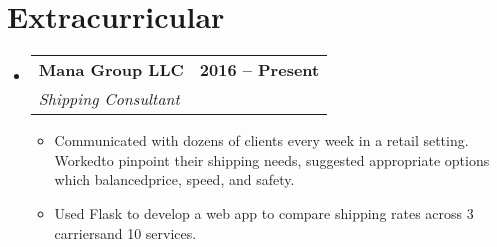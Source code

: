 \documentclass[letterpaper,11pt]{article}
\makeatletter
\newcommand{\resumeItem}[1]{
  \item\small{
    {#1 \vspace{-2pt}}
  }
}
\newcommand{\resumeSubheading}[4]{
  \vspace{-2pt}\item
    \begin{tabular*}{1.0\textwidth}[t]{l@{\extracolsep{\fill}}r}
      \textbf{#1} & \textbf{\small #2} \\
      \textit{\small#3} & \textit{\small #4} \\
    \end{tabular*}\vspace{-7pt}
}
\newcommand{\resumeSubHeadingListStart}{\begin{itemize}[leftmargin=0.0in, label={}]}
\newcommand{\resumeSubHeadingListEnd}{\end{itemize}}
\newcommand{\resumeItemListStart}{\begin{itemize}}
\newcommand{\resumeItemListEnd}{\end{itemize}\vspace{-5pt}}
\makeatother
\begin{document}
\section{Extracurricular}
    \resumeSubHeadingListStart
        \resumeSubheading{Mana Group LLC}{2016 -- Present}{Shipping Consultant}{}
            \resumeItemListStart
                \resumeItem{Communicated with dozens of clients every week in a retail setting. Workedto pinpoint their shipping needs, suggested appropriate options which balancedprice, speed, and safety.}
                \resumeItem{Used Flask to develop a web app to compare shipping rates across 3 carriersand 10 services.}
            \resumeItemListEnd

    \resumeSubHeadingListEnd
\end{document}
